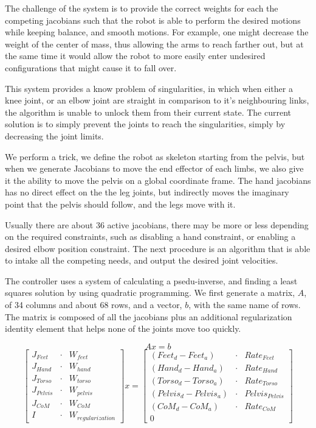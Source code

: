 \documentclass{article}
\begin{document}
The challenge of the system is to provide the correct weights for each the competing jacobians such that the robot is able to perform the desired motions while keeping balance, and smooth motions. For example, one might decrease the weight of the center of mass, thus allowing the arms to reach farther out, but at the same time it would allow the robot to more easily enter undesired configurations that might cause it to fall over.

This system provides a know problem of singularities, in which when either a knee joint, or an elbow joint are straight in comparison to it's neighbouring links, the algorithm is unable to unlock them from their current state. The current solution is to simply prevent the joints to reach the singularities, simply by decreasing the joint limits. 

We perform a trick, we define the robot as skeleton starting from the pelvis, but when we generate Jacobians to move the end effector of each limbs, we also give it the ability to move the pelvis on a global coordinate frame. The hand jacobians has no direct effect on the the leg joints, but indirectly moves the imaginary point that the pelvis should follow, and the legs move with it. 

Usually there are about 36 active jacobians, there may be more or less depending on the required constraints, such as disabling a hand constraint, or enabling a desired elbow position constraint. The next procedure is an algorithm that is able to intake all the competing needs, and output the desired joint velocities. 

The controller uses a system of calculating a psedu-inverse, and finding a least squares solution by using quadratic programming. We first generate a matrix, $A$, of 34 columns and about 68 rows, and a vector, $b$, with the same name of rows. The matrix is composed of all the jacobians plus an additional regularization identity element that helps none of the joints move too quickly. 

\begin{equation} 
Ax = b 
\end{equation}
\begin{equation} 
\begin{bmatrix}
J_{Feet} &\cdot & W_{feet} \\
J_{Hand} &\cdot & W_{hand} \\
J_{Torso} &\cdot & W_{torso} \\
J_{Pelvis} &\cdot & W_{pelvis} \\
J_{CoM} &\cdot & W_{CoM} \\
I &\cdot & W_{regularization}
\end{bmatrix}
x = 
\begin{bmatrix}
(Feet_d - Feet_a) &\cdot & {Rate}_{Feet} \\
(Hand_d - Hand_a) &\cdot & {Rate}_{Hand} \\
(Torso_d - Torso_a) &\cdot & {Rate}_{Torso} \\
(Pelvis_d - Pelvis_a) &\cdot & {Pelvis}_{Pelvis} \\
(CoM_d - CoM_a) &\cdot & {Rate}_{CoM} \\
0
\end{bmatrix}
\end{equation}
\end{document}
